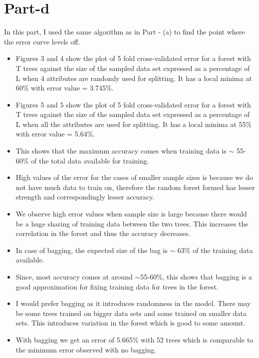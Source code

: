\documentclass[12pt]{article}%
\begin{document}
\section{Part-d}
In this part, I used the same algorithm as in Part - (a) to find the point where the error curve levels off. 
\begin{itemize}
\item Figures 3 and 4 show the plot of  5 fold cross-validated error for a forest with T trees against the size of the sampled data set expressed as a percentage of L when 4 attributes are randomly used for splitting. It has a local minima at 60\% with error value = 3.745\%.
\item Figures 5 and 5 show the plot of  5 fold cross-validated error for a forest with T trees against the size of the sampled data set expressed as a percentage of L when all the  attributes are used for splitting. It has a local minima at 55\% with error value = 5.64\%.
\item This shows that the maximum accuracy comes when training data is $\sim$ 55-60\% of the total data available for training.
\item High values of the error for the cases of smaller sample sizes is because we do not have much data to train on, therefore the random forest formed has lesser strength and correspondingly lesser accuracy. 
\item We observe high error values when sample size is large because there would be a huge sharing of training data between the two trees. This increases the correlation in the forest and thus the accuracy decreases.
\item  In case of bagging, the expected size of the bag is $\sim$ 63\% of the training data available.
\item  Since, most accuracy comes at around $\sim$55-60\%, this shows that bagging is a good approximation for fixing training data for trees in the forest. 
\item I would prefer bagging as it introduces randomness in the model. There may be some trees trained on bigger data sets and some trained on smaller data sets. This introduces variation in the forest which is good to some amount. 
\item With bagging we get an error of 5.665\% with 52 trees which is comparable to the minimum error observed with no bagging. 

\end{itemize}
\end{document}
